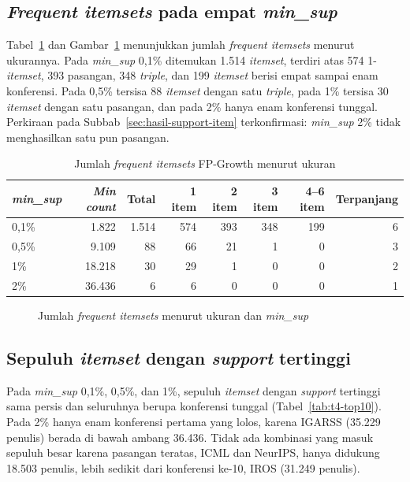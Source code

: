 \subsection{\textit{Frequent itemsets} pada empat \textit{min\_sup}}
\label{sec:hasil-t4-fp-jumlah}
Tabel~\ref{tab:t4-ukuran} dan Gambar~\ref{fig:t4-ukuran} menunjukkan jumlah \textit{frequent itemsets} menurut ukurannya. Pada \textit{min\_sup} 0,1\% ditemukan 1.514 \textit{itemset}, terdiri atas 574 1-\textit{itemset}, 393 pasangan, 348 \textit{triple}, dan 199 \textit{itemset} berisi empat sampai enam konferensi. Pada 0,5\% tersisa 88 \textit{itemset} dengan satu \textit{triple}, pada 1\% tersisa 30 \textit{itemset} dengan satu pasangan, dan pada 2\% hanya enam konferensi tunggal. Perkiraan pada Subbab~\ref{sec:hasil-support-item} terkonfirmasi: \textit{min\_sup} 2\% tidak menghasilkan satu pun pasangan.

\begin{table}[ht]
\caption{Jumlah \textit{frequent itemsets} FP-Growth menurut ukuran}
\label{tab:t4-ukuran}
\small
\begin{tabular}{@{}lrrrrrrr@{}}
\toprule
\textbf{\textit{min\_sup}} & \textbf{\textit{Min count}} & \textbf{Total} & \textbf{1 item} & \textbf{2 item} & \textbf{3 item} & \textbf{4--6 item} & \textbf{Terpanjang} \\
\midrule
0,1\% & 1.822 & 1.514 & 574 & 393 & 348 & 199 & 6 \\
0,5\% & 9.109 & 88 & 66 & 21 & 1 & 0 & 3 \\
1\% & 18.218 & 30 & 29 & 1 & 0 & 0 & 2 \\
2\% & 36.436 & 6 & 6 & 0 & 0 & 0 & 1 \\
\bottomrule
\end{tabular}
\end{table}

\begin{figure}[ht]
\centering
{}
\caption{Jumlah \textit{frequent itemsets} menurut ukuran dan \textit{min\_sup}}
\label{fig:t4-ukuran}
\end{figure}

\subsection{Sepuluh \textit{itemset} dengan \textit{support} tertinggi}
\label{sec:hasil-t4-fp-top10}
Pada \textit{min\_sup} 0,1\%, 0,5\%, dan 1\%, sepuluh \textit{itemset} dengan \textit{support} tertinggi sama persis dan seluruhnya berupa konferensi tunggal (Tabel~\ref{tab:t4-top10}). Pada 2\% hanya enam konferensi pertama yang lolos, karena IGARSS (35.229 penulis) berada di bawah ambang 36.436. Tidak ada kombinasi yang masuk sepuluh besar karena pasangan teratas, ICML dan NeurIPS, hanya didukung 18.503 penulis, lebih sedikit dari konferensi ke-10, IROS (31.249 penulis).

